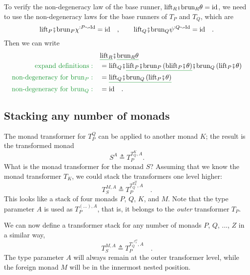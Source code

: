 To verify the non-degeneracy law of the base runner, $\text{lift}_{R}\bef\text{brun}_{R}\theta=\text{id}$,
we need to use the non-degeneracy laws for the base runners of $T_{P}$
and $T_{Q}$, which are 
\[
\text{lift}_{P}\bef\text{brun}_{P}\chi^{:P\leadsto\text{Id}}=\text{id}\quad,\quad\quad\text{lift}_{Q}\bef\text{brun}_{Q}\psi^{:Q\leadsto\text{Id}}=\text{id}\quad.
\]
Then we can write
\begin{align*}
 & \gunderline{\text{lift}_{R}}\bef\gunderline{\text{brun}_{R}\theta}\\
{\color{greenunder}\text{expand definitions}:}\quad & =\text{lift}_{Q}\bef\gunderline{\text{lift}_{P}\bef\text{brun}_{P}\left(\text{blift}_{P}\bef\theta\right)}\bef\text{brun}_{Q}\left(\text{lift}_{P}\bef\theta\right)\\
{\color{greenunder}\text{non-degeneracy for }\text{brun}_{P}:}\quad & =\gunderline{\text{lift}_{Q}\bef\text{brun}_{Q}\left(\text{lift}_{P}\bef\theta\right)}\\
{\color{greenunder}\text{non-degeneracy for }\text{brun}_{Q}:}\quad & =\text{id}\quad.
\end{align*}


\subsection{Stacking any number of monads\label{subsec:Stacking-any-number-of-monads}}

The monad transformer for $T_{P}^{Q}$ can be applied to another monad
$K$; the result is the transformed monad
\[
S^{A}\triangleq T_{P}^{T_{Q}^{K},A}.
\]
What is the monad transformer for the monad $S$? Assuming that we
know the monad transformer $T_{K}$, we could stack the transformers
one level higher:
\[
T_{S}^{M,A}\triangleq T_{P}^{T_{Q}^{T_{K}^{M}},A}\quad.
\]
This looks like a stack of four monads $P$, $Q$, $K$, and $M$.
Note that the type parameter $A$ is used as $T_{P}^{(...),A}$, that
is, it belongs to the \emph{outer} transformer $T_{P}$.

We can now define a transformer stack for any number of monads $P$,
$Q$, ..., $Z$ in a similar way,
\begin{equation}
T_{S}^{M,A}\triangleq T_{P}^{T_{Q}^{\iddots^{T_{Z}^{M}}},A}\quad.\label{eq:general-transformer-stack}
\end{equation}
The type parameter $A$ will always remain at the outer transformer
level, while the foreign monad $M$ will be in the innermost nested
position.

